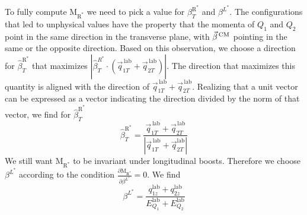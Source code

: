 To fully compute $\mathrm{M_{R^*}}$ we need to pick a value for $\beta_T^{\mathrm{R}^*}$ and
$\beta^{L^*}$. The configurations that led to unphysical \mr values have the property that the
momenta of $Q_1$ and $Q_2$ point in the same direction in the transverse plane, with $\vec{\beta}^{\,\textrm{CM}}$
pointing in the same or the opposite direction. Based on this observation, we choose a direction
for $\hat{\beta}_T^{\mathrm{R}^*}$ that maximizes $|\hat{\beta}_T^{R^*} \cdot
(\vec{q}_{1T}^{\,\textrm{lab}} + \vec{q}_{2T}^{\,\textrm{lab}})|$. The direction that maximizes this
quantity is aligned with the direction of $\vec{q}_{1T}^{\,\textrm{lab}} +
\vec{q}_{2T}^{\,\textrm{lab}}$. Realizing that a unit vector can be expressed as a vector indicating
the direction divided by the norm of that vector, we find for $\hat{\beta}_T^{\mathrm{R}^*}$ 
\begin{equation}
  \hat{\beta}_T^{\mathrm{R}^*} = \frac{\vec{q}_{1T}^{\,\textrm{lab}} +
\vec{q}_{2T}^{\,\textrm{lab}}}{|\vec{q}_{1T}^{\,\textrm{lab}} + \vec{q}_{2T}^{\textrm{lab}}|}
\label{eq:razor_beta_T_Rstar}
\end{equation}
We still want $\mathrm{M_{R^*}}$ to be invariant under longitudinal boosts. Therefore we choose
$\beta^{L^*}$ according to the condition $\frac{\partial \mathrm{M_{R^*}}}{\partial \beta^{L^*}} =
0$.
We find
\begin{equation}
  \beta^{L^*} = \frac{q_{1z}^{\textrm{lab}} + q_{2z}^{\textrm{lab}}}
{E_{Q_1}^{\textrm{lab}} + E_{Q_2}^{\textrm{lab}}}
\label{eq:razor_beta_Lstar}
\end{equation}

